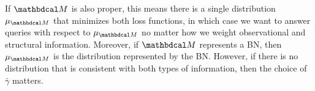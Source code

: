 \documentclass{article}
\newcommand\discard[1]{}
\newcommand\zogamma{{\bar\gamma}}
\begin{document}
\discard{
    For PDGs satisfying a mild condition 
    (required by definition in \citeauthor{pdg-aaai})
    which for now we call \emph{proper},
    selecting a small enough positive value of $\zogamma$
    suffices to ensure that
    the $\zogamma$-semantics consists of only a single distribution.
    The $0^+$ semantics of a proper PDG is also a unique distribution,
    and one that does not depend on the choice of a small positive number. }%
%
%
\def\PrM{\mu_{\dg M}}%
If $\dg M$ is also proper,
    this means there is
    a single distribution $\PrM$
    that minimizes both loss functions, 
    in which case we want to answer queries with respect to $\PrM$
    no matter how we weight observational and structural information. 
Moreover, if $\dg M$ represents a BN,
then $\PrM$ is the distribution represented by the BN.  
However, if there is no distribution that is consistent with both types of information, then the choice of $\zogamma$ matters.  
\end{document}
